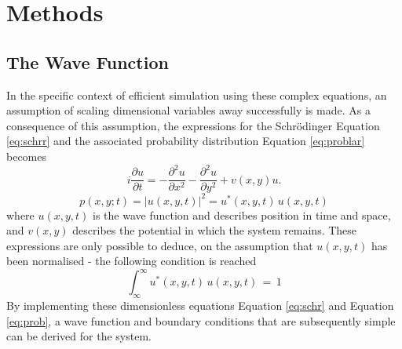 \documentclass[10pt, nofootinbib, twocolumn]{revtex4-1}
\begin{document}
\newpage
\section{Methods}\label{sec:methods} 
\subsection{The Wave Function}
In the specific context of efficient simulation using these complex equations, an assumption of scaling dimensional variables away successfully is made. As a consequence of this assumption, the expressions for the Schrödinger Equation \eqref{eq:schrr} and the associated probability distribution Equation \eqref{eq:problar} becomes 
\begin{equation}\label{eq:schr}
    i \frac{\partial u}{\partial t} = -\frac{\partial^2 u}{\partial x^2} - \frac{\partial^2 u}{\partial y^2} + v(x,y) u.
\end{equation}
\begin{equation}\label{eq:prob}
    p(x,y;t) = |u(x,y,t)|^2 = u^*(x,y,t) \, u(x,y,t)
\end{equation}
where $u(x,y,t)$ is the wave function and describes position in time and space, and $v(x,y)$ describes the potential in which the system remains. These expressions are only possible to deduce, on the assumption that $u(x,y,t)$ has been normalised \cite{griffiths} - the following condition is reached
\begin{equation}\label{eq:norm}
    \int_{\infty}^{\infty}{u^*(x,y,t) \, u(x,y,t)} \, = \, 1
\end{equation}
By implementing these dimensionless equations Equation \eqref{eq:schr} and Equation \eqref{eq:prob}, a wave function and boundary conditions that are subsequently simple can be derived for the system. 
\end{document}

